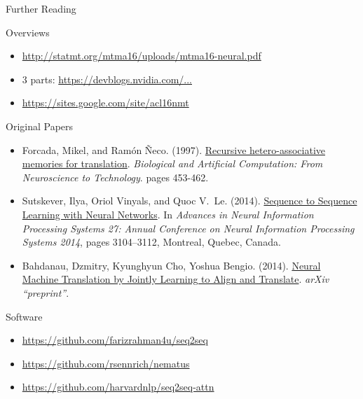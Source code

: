 \documentclass[xcolor=pdftex,x11names,table,hyperref]{beamer}
\begin{document}
\begin{frame}{Further Reading}

\begin{block}{Overviews}
\begin{tiny}
\begin{itemize}
	\item \url{http://statmt.org/mtma16/uploads/mtma16-neural.pdf}
	\item 3 parts: \href{https://devblogs.nvidia.com/parallelforall/introduction-neural-machine-translation-with-gpus}{https://devblogs.nvidia.com/...}
	\item \url{https://sites.google.com/site/acl16nmt}
\end{itemize}
\end{tiny}
\end{block}

\begin{block}{Original Papers}
\begin{tiny}
\begin{itemize}
	\item Forcada, Mikel, and  Ram\'{o}n \~{N}eco. (1997). \href{http://citeseerx.ist.psu.edu/viewdoc/summary?doi=10.1.1.43.1968}{Recursive hetero-associative memories for translation}. \textit{Biological and Artificial Computation: From Neuroscience to Technology}. pages 453-462.
	\item Sutskever, Ilya, Oriol Vinyals, and Quoc V.\ Le.  (2014). \href{http://papers.nips.cc/paper/5346-sequence-to-sequence-learning-with-neural-networks.pdf}{Sequence to Sequence Learning with Neural Networks}. In \textit{Advances in Neural Information Processing Systems 27: Annual Conference on Neural Information Processing Systems 2014}, pages 3104–3112, Montreal, Quebec, Canada.
	\item Bahdanau, Dzmitry, Kyunghyun Cho, Yoshua Bengio. (2014). \href{https://arxiv.org/abs/1409.0473}{Neural Machine Translation by Jointly Learning to Align and Translate}. \textit{arXiv ``preprint''}.
\end{itemize}
\end{tiny}
\end{block}

\begin{block}{Software}
\begin{tiny}
\begin{itemize}
	\item \url{https://github.com/farizrahman4u/seq2seq}
	\item \url{https://github.com/rsennrich/nematus}
	\item \url{https://github.com/harvardnlp/seq2seq-attn}
\end{itemize}
\end{tiny}
\end{block}

\end{frame}





\end{document}

